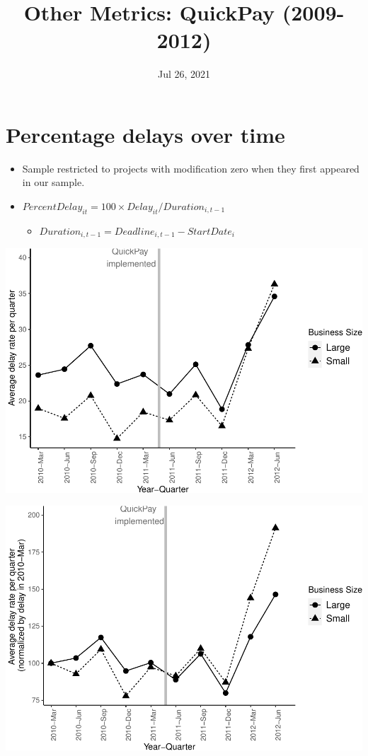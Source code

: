 \documentclass[]{article}
\title{Other Metrics: QuickPay (2009-2012)}
\author{}
\date{\vspace{-2.5em}Jul 26, 2021}
\providecommand{\tightlist}{%
  \setlength{\itemsep}{0pt}\setlength{\parskip}{0pt}}
\begin{document}
\maketitle

\hypertarget{percentage-delays-over-time}{%
\section{Percentage delays over
time}\label{percentage-delays-over-time}}

\begin{itemize}
\tightlist
\item
  Sample restricted to projects with modification zero when they first
  appeared in our sample.
\item
  \(PercentDelay_{it}=100 \times Delay_{it}/Duration_{i,t-1}\)

  \begin{itemize}
  \tightlist
  \item
    \(Duration_{i,t-1} = Deadline_{i,t-1} - StartDate_i\)
  \end{itemize}
\end{itemize}

\includegraphics{qp_first_pc_delay_files/figure-latex/plot_relative_delay-1.pdf}

\includegraphics{qp_first_pc_delay_files/figure-latex/normalized_plot-1.pdf}
\end{document}

